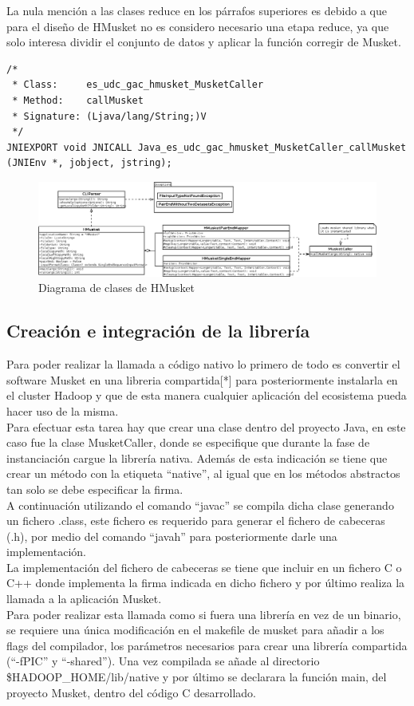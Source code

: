 \documentclass[conference]{IEEEtran}
\begin{document}
La nula mención a las clases reduce en los párrafos superiores es debido a que para el diseño de HMusket no es considero necesario una etapa reduce, ya que solo interesa dividir el conjunto de datos y aplicar la función corregir de Musket.

\begin{lstlisting}[style=CStyle, caption=Cabecera JNI generada]
/*
 * Class:     es_udc_gac_hmusket_MusketCaller
 * Method:    callMusket
 * Signature: (Ljava/lang/String;)V
 */
JNIEXPORT void JNICALL Java_es_udc_gac_hmusket_MusketCaller_callMusket (JNIEnv *, jobject, jstring);
\end{lstlisting}

\begin{figure}
	\includegraphics[width=\textwidth]{figures/hmusket.png}
	\caption{Diagrama de clases de HMusket}
\end{figure}

\subsection{Creación e integración de la librería}
Para poder realizar la llamada a código nativo lo primero de todo es convertir el software Musket en una libreria compartida[*] para posteriormente instalarla en el cluster Hadoop y que de esta manera cualquier aplicación del ecosistema pueda hacer uso de la misma.\\
Para efectuar esta tarea hay que crear una clase dentro del proyecto Java, en este caso fue la clase MusketCaller, donde se especifique que durante la fase de instanciación cargue la librería nativa. Además de esta indicación se tiene que crear un método con la etiqueta ``native'', al igual que en los métodos abstractos tan solo se debe especificar la firma.\\
A continuación utilizando el comando ``javac'' se compila dicha clase generando un fichero .class, este fichero es requerido para generar el fichero de cabeceras (.h), por medio del comando ``javah'' para posteriormente darle una implementación.\\
La implementación del fichero de cabeceras se tiene que incluir en un fichero C o C++ donde implementa la firma indicada en dicho fichero y por último realiza la llamada a la aplicación Musket.\\
Para poder realizar esta llamada como si fuera una librería en vez de un binario, se requiere una única modificación en el makefile de musket para añadir a los flags del compilador, los parámetros necesarios para crear una librería compartida (``-fPIC'' y ``-shared''). Una vez compilada se añade al directorio \$HADOOP\_HOME/lib/native y por último se declarara la función main, del proyecto Musket, dentro del código C desarrollado.
\end{document}
